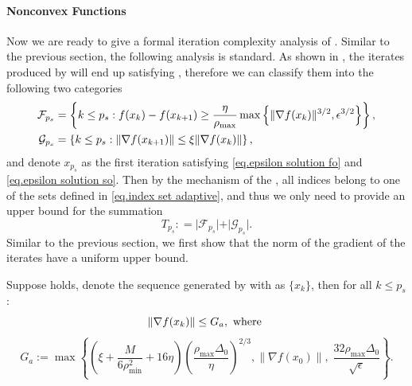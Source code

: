 \paragraph{Nonconvex Functions}
Now we are ready to give a formal iteration complexity analysis of .
Similar to the previous section, the following analysis is standard. As shown in , the iterates produced by  will end up satisfying , therefore we can classify them into the following two categories
\begin{equation}\label{eq.index set adaptive}
    \begin{aligned}
        \mathcal{F}_{p_s} & = \left \{k\leq p_s: f(x_k)-f(x_{k+1})\geq \frac{\eta}{\rho_{\max}}\max \left\{\|\nabla f(x_k)\|^{3/2},\epsilon^{3/2}\right\} \right\}, \\
        \mathcal{G}_{p_s} & = \left \{k\leq p_s: \|\nabla f(x_{k+1})\|\leq \xi\|\nabla f(x_k)\| \right \},
    \end{aligned}
\end{equation}
and denote $x_{p_s}$ as the first iteration satisfying \eqref{eq.epsilon solution fo} and \eqref{eq.epsilon solution so}. Then by the mechanism of the , all indices belong to one of the sets defined in \eqref{eq.index set adaptive}, and thus we only need to provide an upper bound for the summation
\begin{equation}\label{eq.summation form}
    T_{p_s}: = \vert \mathcal{F}_{p_s}\vert + \vert \mathcal{G}_{p_s} \vert .
\end{equation}
Similar to the previous section, we first show that the norm of the gradient of the iterates have a uniform upper bound. 
\begin{lemma}
    \label{lem.bounded g 2}
    Suppose  holds, denote the sequence generated by  with  as $\{x_k\}$,  then for all $k\leq p_s$:
    \begin{equation*}
        \|\nabla f(x_k) \| \leq G_a, \ \text{where }\\
    \end{equation*}
    \begin{equation}
    \label{eq.uniform upperbound g 2}
        G_a:=\max\left \{(\xi+\frac{M}{6\rho_{\min}^2}+16\eta)\left (\frac{\rho_{\max}\Delta_0}{\eta}\right)^{2/3} , \|\nabla f(x_0)\|,\;\frac{32\rho_{\max}\Delta_0}{\sqrt{\epsilon}}\right\}.
    \end{equation}
\end{lemma}
